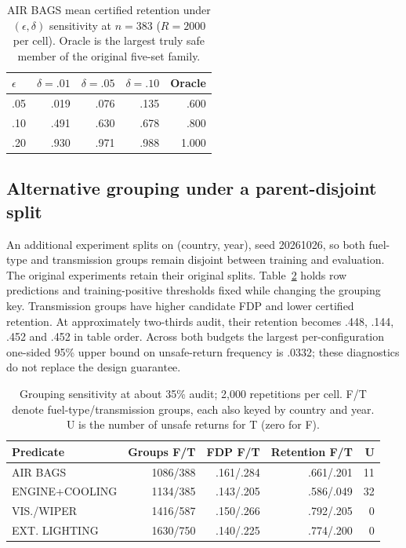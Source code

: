 \documentclass[runningheads]{llncs}
\begin{document}
\begin{table}[H]
\centering
\small
\caption{AIR BAGS mean certified retention under $(\epsilon,\delta)$ sensitivity at $n=383$ ($R=2000$ per cell). Oracle is the largest truly safe member of the original five-set family.}
\label{tab:epsdelta}
\begin{tabular}{lrrrr}
\toprule
$\epsilon$ & $\delta=.01$ & $\delta=.05$ & $\delta=.10$ & Oracle\\
\midrule
.05 & .019 & .076 & .135 & .600\\
.10 & .491 & .630 & .678 & .800\\
.20 & .930 & .971 & .988 & 1.000\\
\bottomrule
\end{tabular}
\end{table}

\subsection{Alternative grouping under a parent-disjoint split}
An additional experiment splits on (country, year), seed 20261026, so both fuel-type and transmission groups remain disjoint between training and evaluation. The original experiments retain their original splits. Table~\ref{tab:grouping} holds row predictions and training-positive thresholds fixed while changing the grouping key. Transmission groups have higher candidate FDP and lower certified retention. At approximately two-thirds audit, their retention becomes .448, .144, .452 and .452 in table order. Across both budgets the largest per-configuration one-sided 95\% upper bound on unsafe-return frequency is .0332; these diagnostics do not replace the design guarantee.

\begin{table}[H]
\centering\small
\caption{Grouping sensitivity at about 35\% audit; 2,000 repetitions per cell. F/T denote fuel-type/transmission groups, each also keyed by country and year. U is the number of unsafe returns for T (zero for F).}
\label{tab:grouping}
\begin{tabular}{lrrrr}
\toprule
Predicate & Groups F/T & FDP F/T & Retention F/T & U\\
\midrule
AIR BAGS & 1086/388 & .161/.284 & .661/.201 & 11\\
ENGINE+COOLING & 1134/385 & .143/.205 & .586/.049 & 32\\
VIS./WIPER & 1416/587 & .150/.266 & .792/.205 & 0\\
EXT. LIGHTING & 1630/750 & .140/.225 & .774/.200 & 0\\
\bottomrule
\end{tabular}
\end{table}
\end{document}
